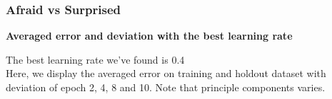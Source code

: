 \documentclass{article} %
\begin{document}
\begin{figure}[htb]
    
    \end{figure}

\newpage
\subsubsection{Afraid vs Surprised}

\textbf{Averaged error and deviation with the best learning rate}

The best learning rate we've found is 0.4 \\
Here, we display the averaged error on training and holdout dataset with deviation of epoch 2, 4, 8 and 10. Note that principle components varies.
\end{document}
